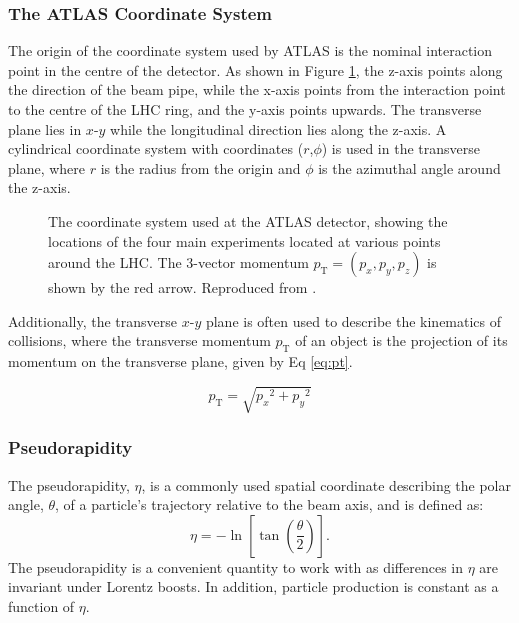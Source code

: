 \subsubsection{The ATLAS Coordinate System}

The origin of the coordinate system used by ATLAS is the nominal interaction point in the centre of the detector. As shown in Figure \ref{fig:atlas-coord-system}, the z-axis points along the direction of the beam pipe, while the x-axis points from the interaction point to the centre of the \ac{LHC} ring, and the y-axis points upwards.
The transverse plane lies in $x$-$y$ while the longitudinal direction lies along the z-axis. A cylindrical coordinate system with coordinates ($r$,$\phi$) is used in the transverse plane, where $r$ is the radius from the origin and $\phi$ is the azimuthal angle around the z-axis.

\begin{figure}[!htbp]
  \centering
  
  \caption{
    The coordinate system used at the ATLAS detector, showing the locations of the four main experiments located at various points around the \ac{LHC}. The 3-vector momentum $p_{\text{T}} = (p_x, p_y, p_z)$ is shown by the red arrow. Reproduced from \cite{Strong:2020mge}.
  }
  \label{fig:atlas-coord-system}
\end{figure}

Additionally, the transverse $x$-$y$ plane is often used to describe the kinematics of collisions, where the transverse momentum $p_{\text{T}}$ of an object is the projection of its momentum on the transverse plane, given by Eq \ref{eq:pt}.

%
\begin{equation}\label{eq:pt}
  p_\text{T} = \sqrt{ {p_x}^2 + {p_y}^2 }
\end{equation}





\subsubsection{Pseudorapidity}

The pseudorapidity, $\eta$, is a commonly used spatial coordinate describing the polar angle, $\theta$, of a particle's trajectory relative to the beam axis, and is defined as:
%
\begin{equation}\label{eq:pseudorap}
  \eta = - \ln \left[ \tan \left( \frac{\theta}{2} \right) \right] .
\end{equation}
%
The pseudorapidity is a convenient quantity to work with as differences in $\eta$ are invariant under Lorentz boosts. In addition, particle production is constant as a function of $\eta$.


